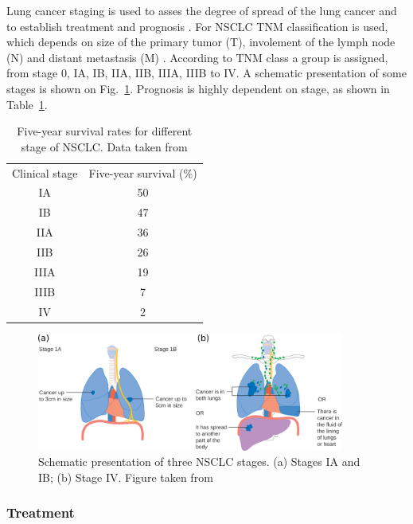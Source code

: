 \documentclass[type=dr, dr=rernat, accentcolor=tud7b,colorbacktitle, bigchapter, openright, twoside, 12pt ]{tudthesis}
\begin{document}
Lung cancer staging is used to asses the degree of spread of the lung cancer and to establish treatment and prognosis \cite{Chheang2013}. For NSCLC TNM classification is used, which depends on
size of the primary tumor (T), involement of the lymph node (N) and distant metastasis (M) \cite{Kasper2015}. According to TNM class a group is assigned, from stage 0, IA, IB, IIA, IIB, IIIA, IIIB to IV. 
A schematic presentation of some stages is shown on Fig.~\ref{Fig:Stages}. Prognosis is highly dependent on stage, as shown in Table~\ref{tab:prognosis}.

\begin{table}[H]
  \centering
  \caption{Five-year survival rates for different stage of NSCLC. Data taken from \cite{Rami2009}}
  \begin{tabular}{|c|c|}
   \hline
   \hline
Clinical stage & Five-year survival (\%) \\
IA & 50 \\
IB & 47 \\
IIA & 36 \\
IIB & 26 \\
IIIA & 19 \\
IIIB & 7 \\
IV & 2 \\
\hline
\hline
  \end{tabular}
  \label{tab:prognosis}
\end{table}

\begin{figure}[H]
\begin{center}
\includegraphics[width=0.9\textwidth]{./Images/Stages.png}
\caption{Schematic presentation of three NSCLC stages. (a) Stages IA and IB; (b) Stage IV. Figure taken from \cite{CancerStage}}
\label{Fig:Stages}
\end{center}
\end{figure}

\subsubsection{Treatment}
\end{document}
